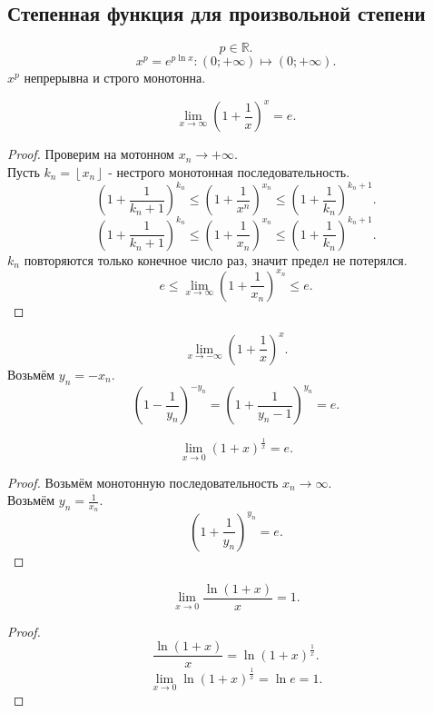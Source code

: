 \documentclass[11pt, oneside]{article}   	%
\begin{document}
    \subsection{Степенная функция для произвольной степени}
     \[ p\in \mathbb{R} .\] 
    \[ x^{p} = e^{p\ln x}: \left( 0; +\infty \right) \mapsto \left( 0; +\infty \right)   .\]
    $x^{p}$ непрерывна и строго монотонна.
    \begin{theorem}
        \[ \lim\limits_{x \to \infty} \left( 1 + \frac{1}{x} \right)^{x} = e   .\]
        \begin{proof}
            Проверим на мотонном $x_n \to +\infty$.\\
            Пусть $k_n = \left\lfloor x_n \right\rfloor$ - нестрого монотонная последовательность.\\
            \[ \left( 1 + \frac{1}{k_n + 1} \right)^{k_n} \le \left( 1+\frac{1}{x^{n}} \right)^{x_n} \le \left( 1 + \frac{1}{k_n} \right)^{k_n+1}   .\]
            \[ \left( 1+\frac{1}{k_n+1}\right)^{k_n} \le \left( 1 + \frac{1}{x_n} \right)^{x_n} \le \left( 1 + \frac{1}{k_n} \right)^{k_n+1}    .\]
            $k_n$ повторяются только конечное число раз, значит предел не потерялся.\\
            \[ e \le \lim\limits_{x \to \infty} \left( 1 + \frac{1}{x_n} \right)^{x_n} \le e  .\] 
        \end{proof}
    \end{theorem}
    \begin{tlemma}
        \[ \lim\limits_{x \to -\infty} \left( 1+\frac{1}{x} \right)^{x}  .\]
        Возьмём $y_n = -x_n$.\\
        \[ \left( 1-\frac{1}{y_n} \right)^{-y_n} = \left( 1+\frac{1}{y_n-1}\right)^{y_n} = e   .\] 
    \end{tlemma}
    \begin{tlemma}
        \[ \lim\limits_{x \to 0} \left( 1+x \right)^{\frac{1}{x}} = e .\]
        \begin{proof}
            Возьмём монотонную последовательность $x_n \to \infty$.\\
            Возьмём $y_n = \frac{1}{x_n}$.
            \[ \left( 1+\frac{1}{y_n} \right)^{y_n} = e  .\] 
        \end{proof}
    \end{tlemma}
    \begin{theorem}
        \[ \lim\limits_{x \to 0} \frac{\ln(1+x)}{x} = 1 .\]
        \begin{proof}
            \[ \frac{\ln(1+x)}{x} = \ln \left( 1+x \right)^{\frac{1}{x}}  .\]
            \[ \lim\limits_{x \to 0} \ln \left( 1+x \right)^{\frac{1}{x}} = \ln e = 1 .\] 
        \end{proof}
    \end{theorem}
\end{document}
